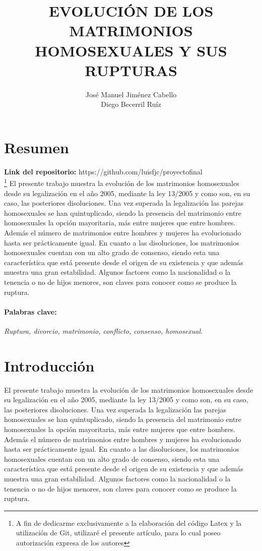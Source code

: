 \documentclass{article}
\begin{document}
	\title{\textbf{\Huge{EVOLUCIÓN DE LOS MATRIMONIOS HOMOSEXUALES Y SUS RUPTURAS}}}
	\author{José Manuel Jiménez Cabello \\ Diego Becerril Ruíz}
	\maketitle
	\newpage
	
	\tableofcontents
	\newpage
	
	\section{Resumen} 
	

\textbf{Link del repositorio:} https://github.com/luisfjc/proyectofinal \\

	\footnote[1]{A fin de dedicarme exclusivamente a la elaboración del código Latex y la utilización de Git, utilizaré el presente artículo, para lo cual poseo autorización expresa de los autores}
El presente trabajo muestra la evolución de los matrimonios homosexuales desde su legalización en el año 2005, mediante la ley 13/2005 y como son, en su caso, las posteriores disoluciones. Una vez superada la legalización las parejas homosexuales se han quintuplicado, siendo la presencia del matrimonio entre homosexuales la opción mayoritaria, más entre mujeres que entre hombres. Además el número de matrimonios entre hombres y mujeres ha evolucionado hasta ser prácticamente igual. En cuanto a las disoluciones, los matrimonios homosexuales cuentan con un alto grado de consenso, siendo esta una característica que está presente desde el origen de su existencia y que además muestra una gran estabilidad. Algunos factores como la nacionalidad o la tenencia o no de hijos menores, son claves para conocer como se produce la ruptura.
\paragraph{Palabras clave:}
 \textit{Ruptura, divorcio, matrimonio, conflicto, consenso, homosexual.}
\section{Introducción}
El presente trabajo muestra la evolución de los matrimonios homosexuales desde su legalización en el año 2005, mediante la ley 13/2005 y como son, en su caso, las posteriores disoluciones. Una vez superada la legalización las parejas homosexuales se han quintuplicado, siendo la presencia del matrimonio entre homosexuales la opción mayoritaria, más entre mujeres que entre hombres. Además el número de matrimonios entre hombres y mujeres ha evolucionado hasta ser prácticamente igual. En cuanto a las disoluciones, los matrimonios homosexuales cuentan con un alto grado de consenso, siendo esta una característica que está presente desde el origen de su existencia y que además muestra una gran estabilidad. Algunos factores como la nacionalidad o la tenencia o no de hijos menores, son claves para conocer como se produce la ruptura.
\end{document}
